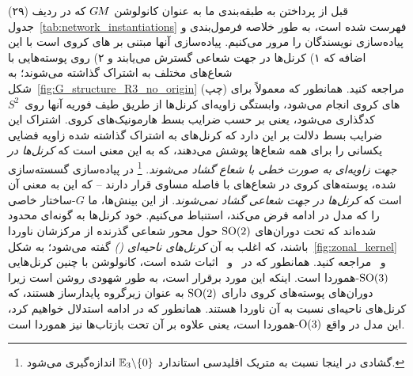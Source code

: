قبل از پرداختن به طبقه‌بندی ما به عنوان کانولوشن $G\mkern-1.4muM$ که در ردیف (۲۹) جدول~\ref{tab:network_instantiations} فهرست شده است، به طور خلاصه فرمول‌بندی و پیاده‌سازی نویسندگان را مرور می‌کنیم.
پیاده‌سازی آنها مبتنی بر های کروی است با این اضافه که
۱) کرنل‌ها در جهت شعاعی گسترش می‌یابند و
۲) روی پوسته‌هایی با شعاع‌های مختلف به اشتراک گذاشته می‌شوند؛ به شکل~\ref{fig:G_structure_R3_no_origin} (چپ) مراجعه کنید.
همانطور که معمولاً برای های کروی انجام می‌شود، وابستگی زاویه‌ای کرنل‌ها از طریق طیف فوریه آنها روی~$S^2$ کدگذاری می‌شود، یعنی بر حسب ضرایب بسط هارمونیک‌های کروی.
اشتراک این ضرایب بسط دلالت بر این دارد که کرنل‌های به اشتراک گذاشته شده زاویه فضایی یکسانی را برای همه شعاع‌ها پوشش می‌دهند، که به این معنی است که \emph{کرنل‌ها در جهت زاویه‌ای به صورت خطی با شعاع گشاد می‌شوند}.%
\footnote{
	گشادی در اینجا نسبت به متریک اقلیدسی استاندارد $\mathbb{E}_3 \backslash \{0\}$ اندازه‌گیری می‌شود.
}
در پیاده‌سازی گسسته‌سازی شده، پوسته‌های کروی در شعاع‌های با فاصله مساوی قرار دارند -- که این به معنی آن است که \emph{کرنل‌ها در جهت شعاعی گشاد نمی‌شوند}.
از این بینش‌ها، ما $G$-ساختار خاصی را که مدل در ادامه فرض می‌کند، استنباط می‌کنیم.
خود کرنل‌ها به گونه‌ای محدود شده‌اند که تحت دوران‌های $\operatorname{SO}(2)$ حول محور شعاعی گذرنده از مرکزشان ناوردا باشند، که اغلب به آن \emph{کرنل‌های ناحیه‌ای ()} گفته می‌شود؛
به شکل~\ref{fig:zonal_kernel} و~\cite{esteves2018zonalSpherical} مراجعه کنید.
همانطور که در~\cite{esteves2018zonalSpherical} و~\cite{ramasinghe2019representation} اثبات شده است، کانولوشن با چنین کرنل‌هایی $\operatorname{SO}(3)$-هموردا است.
اینکه این مورد برقرار است، به طور شهودی روشن است زیرا دوران‌های پوسته‌های کروی دارای $\operatorname{SO}(2)$ به عنوان زیرگروه پایدارساز هستند، که کرنل‌های ناحیه‌ای نسبت به آن ناوردا هستند.
همانطور که در ادامه استدلال خواهیم کرد، این مدل در واقع $\operatorname{O}(3)$-هموردا است، یعنی علاوه بر آن تحت بازتاب‌ها نیز هموردا است.

